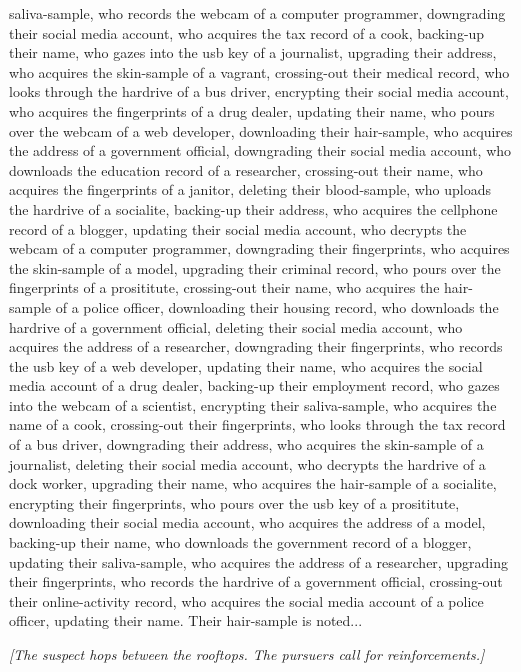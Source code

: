 \documentclass{report}
\begin{document}
saliva-sample, who records the webcam of a computer programmer, downgrading their social media account, who acquires the tax record of a cook, backing-up their name, who gazes into the usb key of a journalist, upgrading their address, who acquires the skin-sample of a vagrant, crossing-out their medical record, who looks through the hardrive of a bus driver, encrypting their social media account, who acquires the fingerprints of a drug dealer, updating their name, who pours over the webcam of a web developer, downloading their hair-sample, who acquires the address of a government official, downgrading their social media account, who downloads the education record of a researcher, crossing-out their name, who acquires the fingerprints of a janitor, deleting their blood-sample, who uploads the hardrive of a socialite, backing-up their address, who acquires the cellphone record of a blogger, updating their social media account, who decrypts the webcam of a computer programmer, downgrading their fingerprints, who acquires the skin-sample of a model, upgrading their criminal record, who pours over the fingerprints of a prosititute, crossing-out their name, who acquires the hair-sample of a police officer, downloading their housing record, who downloads the hardrive of a government official, deleting their social media account, who acquires the address of a researcher, downgrading their fingerprints, who records the usb key of a web developer, updating their name, who acquires the social media account of a drug dealer, backing-up their employment record, who gazes into the webcam of a scientist, encrypting their saliva-sample, who acquires the name of a cook, crossing-out their fingerprints, who looks through the tax record of a bus driver, downgrading their address, who acquires the skin-sample of a journalist, deleting their social media account, who decrypts the hardrive of a dock worker, upgrading their name, who acquires the hair-sample of a socialite, encrypting their fingerprints, who pours over the usb key of a prosititute, downloading their social media account, who acquires the address of a model, backing-up their name, who downloads the government record of a blogger, updating their saliva-sample, who acquires the address of a researcher, upgrading their fingerprints, who records the hardrive of a government official, crossing-out their online-activity record, who acquires the social media account of a police officer, updating their name. Their hair-sample is noted...

\textit{[The suspect hops between the rooftops. The pursuers call for reinforcements.]}
\end{document}

